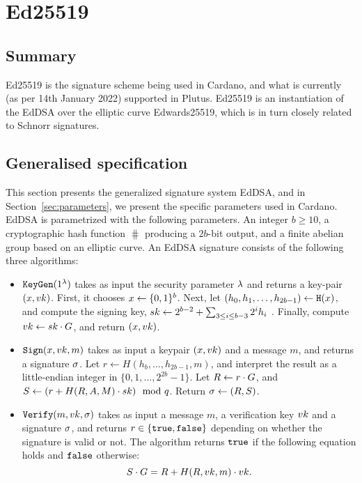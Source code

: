 \section{Ed25519}
\label{sec:ed25519}

\subsection{Summary}
Ed25519 is the signature scheme being used in Cardano, and what is currently (as per 14th January 2022) supported in
Plutus. Ed25519 is an instantiation of the EdDSA over the elliptic curve Edwards25519, which is in turn closely
related to Schnorr signatures.

\subsection{Generalised specification}
This section presents the generalized signature system EdDSA, and in Section~\ref{sec:parameters}, we present the
specific parameters used in Cardano. EdDSA is parametrized with the following parameters. An integer $b\geq 10$, a
cryptographic hash function $\hash$ producing a $2b$-bit output, and a finite abelian group based on an elliptic
curve. An EdDSA signature consists of the following three algorithms:
\begin{itemize}
    \item $\texttt{KeyGen}(1^\lambda)$ takes as input the security parameter $\lambda$ and returns a key-pair $
    (x, vk)$. First, it chooses $x\leftarrow\{0,1\}^b$. Next, let $(h_0, h_1, \ldots, h_{2b - 1})
    \gets\texttt{H}(x)$, and compute the signing key, $sk \gets 2^{b-2} + \sum_{3\leq i\leq b-3}2^i h_i$
    . Finally, compute $vk \gets sk \cdot G$, and return $(x, vk)$.
    \item $\texttt{Sign}(x, vk, m)$ takes as input a keypair $(x, vk)$ and a message $m$, and returns a
    signature $\sigma$. Let $r \gets H(h_b, \ldots, h_{2b-1}, m)$, and interpret the result as a little-endian
    integer in $\{0,1,\ldots, 2^{2b}-1\}$. Let $R \gets r\cdot G$, and $S \gets (r + H(R, A, M)\cdot
    sk) \mod {q}$. Return $\sigma \gets (R, S)$.
    \item $\texttt{Verify}(m, vk, \sigma)$ takes as input a message $m$, a verification key $vk$ and a signature
    $\sigma$, and returns $r\in\{\texttt{true}, \texttt{false}\}$ depending on whether the signature is valid or not. The algorithm
    returns $\texttt{true}$ if the following equation holds and $\texttt{false}$ otherwise:
    \[S\cdot G = R + H(R, vk, m)\cdot vk.\]
\end{itemize}

